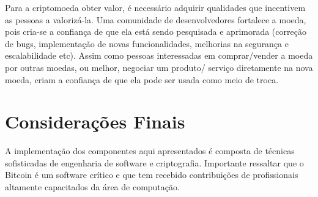 Para a criptomoeda obter valor, é necessário adquirir qualidades que incentivem as pessoas a valorizá-la. Uma comunidade de desenvolvedores fortalece a moeda, pois cria-se a confiança de que ela está sendo pesquisada e aprimorada (correção de bugs, implementação de novas funcionalidades, melhorias na segurança e escalabilidade etc). Assim como pessoas interessadas em comprar/vender a moeda por outras moedas, ou melhor, negociar um produto/ serviço diretamente na nova moeda, criam a confiança de que ela pode ser usada como meio de troca.

\section{Considerações Finais}

A implementação dos componentes aqui apresentados é composta de técnicas sofisticadas de engenharia de software e criptografia. Importante ressaltar que o Bitcoin é um software crítico e que tem recebido contribuições de profissionais altamente capacitados da área de computação.